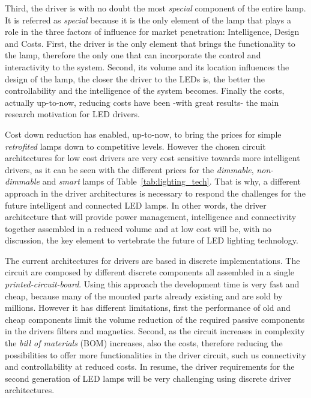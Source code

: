 Third, the driver is with no doubt the most \emph{special} component of the entire lamp. It is referred as \emph{special} because it is the only element of the lamp that plays a role in the three factors of influence for market penetration: Intelligence, Design and Costs. First, the driver is the only element that brings the functionality to the lamp, therefore the only one that can incorporate the control and interactivity to the system. Second, its volume and its location influences the design of the lamp, the closer the driver to the LEDs is, the better the controllability and the intelligence of the system becomes. Finally the costs, actually up-to-now, reducing costs have been -with great results- the main research motivation for LED drivers.

Cost down reduction has enabled, up-to-now, to bring the prices for simple \emph{retrofited} lamps down to competitive levels. However the chosen circuit architectures for low cost drivers are very cost sensitive towards more intelligent drivers, as it can be seen with the different prices for the \emph{dimmable}, \emph{non-dimmable} and \emph{smart} lamps of  Table~\ref{tab:lighting_tech}. That is why, a different approach in the driver architectures is necessary  to respond the challenges for the future intelligent and connected LED lamps. In other words, the driver architecture that will provide power management, intelligence and connectivity together assembled in a reduced volume and at low cost will be, with no discussion, the key element to vertebrate the future of LED lighting technology.

The current architectures for drivers are based in discrete implementations. The circuit are composed by different discrete components all assembled in a single \emph{printed-circuit-board}. Using this approach the development time is very fast and cheap, because many of the mounted parts already existing and are sold by millions. However it has different limitations, first the performance of old and cheap components limit the volume reduction of the required  passive components in the drivers filters and magnetics. Second, as the circuit increases in complexity the \emph{bill of materials} (BOM) increases, also the costs, therefore reducing the possibilities to offer more functionalities in the driver circuit, such us connectivity and controllability at reduced costs. In resume, the driver requirements for the second generation of LED lamps will be very challenging using  discrete driver  architectures.

